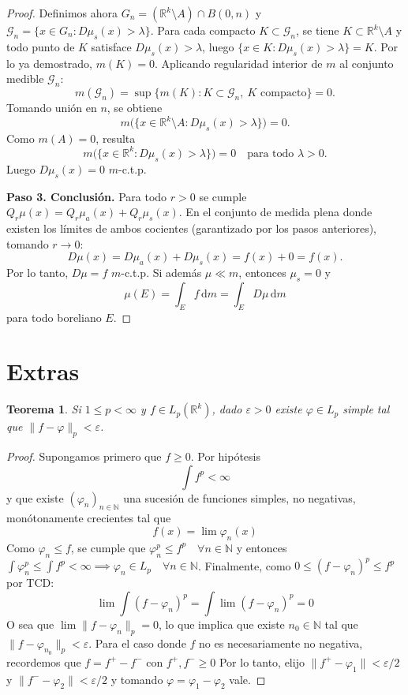 \documentclass[12pt,a4paper]{article}
\theoremstyle{profesional}
\newtheorem{teorema}{Teorema}[section]
\theoremstyle{definicion-style}
\newcommand{\R}{\mathbb{R}}
\newcommand{\N}{\mathbb{N}}
\begin{document}
\begin{proof}
    Definimos ahora \( G_n=(\R^k\setminus A)\cap B(0,n) \) y \( \mathcal{G}_n = \{ x \in G_n : D\mu_s(x) > \lambda \} \). Para cada compacto \( K\subset \mathcal{G}_n \), se tiene \( K\subset \R^k\setminus A \) y todo punto de \( K \) satisface \( D\mu_s(x)>\lambda \), luego \( \{x\in K: D\mu_s(x)>\lambda\}=K \). Por lo ya demostrado, \( m(K)=0 \). Aplicando regularidad interior de \( m \) al conjunto medible \( \mathcal{G}_n \):
    \[
        m(\mathcal{G}_n)=\sup \{m(K): K\subset \mathcal{G}_n,\ K \text{ compacto}\}=0.
    \]
    Tomando unión en \( n \), se obtiene
    \[
        m\big( \{ x \in \R^k\setminus A: D\mu_s(x)> \lambda \} \big) = 0.
    \]
    Como \( m(A)=0 \), resulta
    \[
        m\big( \{x \in \R^k: D\mu_s(x) > \lambda \} \big)=0
        \quad\text{para todo }\lambda>0.
    \]
    Luego \( D\mu_s(x)=0 \) \( m \)-c.t.p.

    \textbf{Paso 3. Conclusión.}
    Para todo \( r>0 \) se cumple \( Q_r\mu(x)=Q_r\mu_a(x)+Q_r\mu_s(x) \). En el conjunto de medida plena donde existen los límites de ambos cocientes (garantizado por los pasos anteriores), tomando \( r\to 0 \):
    \[
        D\mu(x)=D\mu_a(x)+D\mu_s(x)=f(x)+0=f(x).
    \]
    Por lo tanto, \( D\mu=f \) \( m \)-c.t.p. Si además \( \mu\ll m \), entonces \( \mu_s=0 \) y
    \[
        \mu(E)=\int_E f\,\mathrm dm=\int_E D\mu \, \mathrm dm
    \]
    para todo boreliano \( E \).
\end{proof}

\section{Extras}

\begin{teorema}
    Si \( 1 \leq p < \infty \) y \( f \in L_p(\R^k) \), dado \( \varepsilon > 0 \)
    existe \( \varphi \in L_p \) simple tal que \( \| f - \varphi \|_p < \varepsilon \).
\end{teorema}
\begin{proof}
    Supongamos primero que \( f \geq 0 \). Por hipótesis \[
        \int f^p < \infty
    \]
    y que existe \( {(\varphi_n)}_{n \in \N} \) una sucesión de funciones simples, no negativas, monótonamente crecientes tal que \[
        f(x) = \lim \varphi_n(x)
    \]
    Como \( \varphi_n \leq f \), se cumple que \( \varphi_n^p \leq f^p \quad \forall n \in \N \) y entonces \( \int \varphi_n^p \leq \int f^p < \infty \implies \varphi_n \in L_p \quad \forall n \in \N \).
    Finalmente, como \( 0 \leq {(f - \varphi_n)}^p \leq f^p \) por TCD: \[
        \lim \int {(f - \varphi_n)}^p = \int \lim {(f - \varphi_n)}^p = 0
    \]
    O sea que \( \lim \| f - \varphi_n \|_p = 0 \), lo que implica que existe \( n_0 \in \N \) tal que \( \| f - \varphi_{n_0} \|_p < \varepsilon \).
    Para el caso donde \( f \) no es necesariamente no negativa, recordemos que \( f = f^+ - f^- \) con \( f^+, f^- \geq 0 \)
    Por lo tanto, elijo \( \| f^+ - \varphi_1 \| < \varepsilon / 2 \) y \( \| f^- - \varphi_2 \| < \varepsilon/2 \) y tomando \( \varphi = \varphi_1 - \varphi_2 \) vale.
\end{proof}
\end{document}
